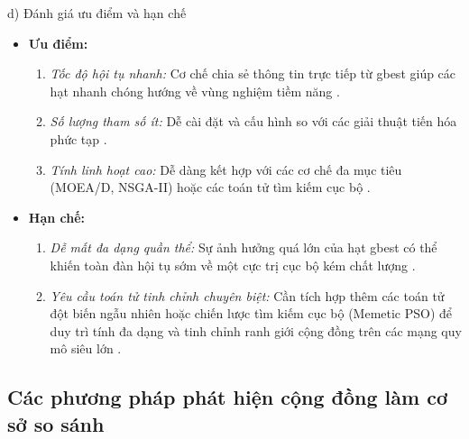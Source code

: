 \documentclass[14pt,a4paper]{extarticle}
\begin{document}
\noindent d) Đánh giá ưu điểm và hạn chế
\begin{itemize}
    \item \textbf{Ưu điểm:}
    \begin{enumerate}
        \item \textit{Tốc độ hội tụ nhanh:} Cơ chế chia sẻ thông tin trực tiếp từ gbest giúp các hạt nhanh chóng hướng về vùng nghiệm tiềm năng \cite{Baraa2021, Beldi2025}.
        \item \textit{Số lượng tham số ít:} Dễ cài đặt và cấu hình so với các giải thuật tiến hóa phức tạp \cite{Baraa2021}.
        \item \textit{Tính linh hoạt cao:} Dễ dàng kết hợp với các cơ chế đa mục tiêu (MOEA/D, NSGA-II) hoặc các toán tử tìm kiếm cục bộ \cite{Baraa2021}.
    \end{enumerate}
    \item \textbf{Hạn chế:}
    \begin{enumerate}
        \item \textit{Dễ mất đa dạng quần thể:} Sự ảnh hưởng quá lớn của hạt gbest có thể khiến toàn đàn hội tụ sớm về một cực trị cục bộ kém chất lượng \cite{Baraa2021, Beldi2025}.
        \item \textit{Yêu cầu toán tử tinh chỉnh chuyên biệt:} Cần tích hợp thêm các toán tử đột biến ngẫu nhiên hoặc chiến lược tìm kiếm cục bộ (Memetic PSO) để duy trì tính đa dạng và tinh chỉnh ranh giới cộng đồng trên các mạng quy mô siêu lớn \cite{Baraa2021, Beldi2025}.
    \end{enumerate}
\end{itemize}

\subsection{Các phương pháp phát hiện cộng đồng làm cơ sở so sánh}
\end{document}
